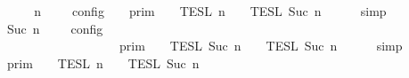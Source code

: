 \begin{isabellebody}
%
\isadelimproof
%
\endisadelimproof
%
\isatagproof
{}\isamarkupfalse%
\ {\isacharminus}\isanewline
\ \ \isamarkupfalse%
\ {\isacartoucheopen}{\isasymlbrakk}\ {\isasymGamma}{\isacharcomma}\ n\ {\isasymturnstile}\ {\isacharbrackleft}{\isacharbrackright}\ {\isasymtriangleright}\ {\isasymPhi}\ {\isasymrbrakk}\isactrlsub c\isactrlsub o\isactrlsub n\isactrlsub f\isactrlsub i\isactrlsub g\ {\isacharequal}\ {\isasymlbrakk}{\isasymlbrakk}\ {\isasymGamma}\ {\isasymrbrakk}{\isasymrbrakk}\isactrlsub p\isactrlsub r\isactrlsub i\isactrlsub m\ {\isasyminter}\ {\isasymlbrakk}{\isasymlbrakk}\ {\isacharbrackleft}{\isacharbrackright}\ {\isasymrbrakk}{\isasymrbrakk}\isactrlsub T\isactrlsub E\isactrlsub S\isactrlsub L\isactrlbsup {\isasymge}\ n\isactrlesup \ {\isasyminter}\ {\isasymlbrakk}{\isasymlbrakk}\ {\isasymPhi}\ {\isasymrbrakk}{\isasymrbrakk}\isactrlsub T\isactrlsub E\isactrlsub S\isactrlsub L\isactrlbsup {\isasymge}\ Suc\ n\isactrlesup {\isacartoucheclose}\isanewline
\ \ \ \ \isamarkupfalse%
\ simp\isanewline
\ \ \isamarkupfalse%
\ \isamarkupfalse%
\ {\isacartoucheopen}{\isasymlbrakk}\ {\isasymGamma}{\isacharcomma}\ Suc\ n\ {\isasymturnstile}\ {\isasymPhi}\ {\isasymtriangleright}\ {\isacharbrackleft}{\isacharbrackright}\ {\isasymrbrakk}\isactrlsub c\isactrlsub o\isactrlsub n\isactrlsub f\isactrlsub i\isactrlsub g\isanewline
\ \ \ \ \ \ \ \ \ \ \ \ \ \ \ \ \ \ {\isacharequal}\ {\isasymlbrakk}{\isasymlbrakk}\ {\isasymGamma}\ {\isasymrbrakk}{\isasymrbrakk}\isactrlsub p\isactrlsub r\isactrlsub i\isactrlsub m\ {\isasyminter}\ {\isasymlbrakk}{\isasymlbrakk}\ {\isasymPhi}\ {\isasymrbrakk}{\isasymrbrakk}\isactrlsub T\isactrlsub E\isactrlsub S\isactrlsub L\isactrlbsup {\isasymge}\ Suc\ n\isactrlesup \ {\isasyminter}\ {\isasymlbrakk}{\isasymlbrakk}\ {\isacharbrackleft}{\isacharbrackright}\ {\isasymrbrakk}{\isasymrbrakk}\isactrlsub T\isactrlsub E\isactrlsub S\isactrlsub L\isactrlbsup {\isasymge}\ Suc\ n\isactrlesup {\isacartoucheclose}\isanewline
\ \ \ \ \isamarkupfalse%
\ simp\isanewline
\ \ \isamarkupfalse%
\ \isamarkupfalse%
\ {\isacartoucheopen}{\isasymlbrakk}{\isasymlbrakk}\ {\isasymGamma}\ {\isasymrbrakk}{\isasymrbrakk}\isactrlsub p\isactrlsub r\isactrlsub i\isactrlsub m\ {\isasyminter}\ {\isasymlbrakk}{\isasymlbrakk}\ {\isacharbrackleft}{\isacharbrackright}\ {\isasymrbrakk}{\isasymrbrakk}\isactrlsub T\isactrlsub E\isactrlsub S\isactrlsub L\isactrlbsup {\isasymge}\ n\isactrlesup \ {\isasyminter}\ {\isasymlbrakk}{\isasymlbrakk}\ {\isasymPhi}\ {\isasymrbrakk}{\isasymrbrakk}\isactrlsub T\isactrlsub E\isactrlsub S\isactrlsub L\isactrlbsup {\isasymge}\ Suc\ n\isactrlesup \isanewline

\end{isabellebody}
